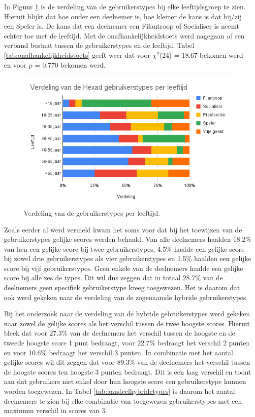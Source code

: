 In Figuur \ref{fig:verdelingleeftijd} is de verdeling van de gebruikerstypes bij elke leeftijdsgroep te zien. Hieruit blijkt dat hoe ouder een deelnemer is, hoe kleiner de kans is dat hij/zij een Speler is. De kans dat een deelnemer een Filantroop of Socialiser is neemt echter toe met de leeftijd. Met de onafhankelijkheidstoets werd nagegaan of een verband bestaat tussen de gebruikerstypes en de leeftijd. Tabel \ref{tab:onafhankelijkheidstoets} geeft weer dat voor $\chi^2$(24) = 18.67 bekomen werd en voor p = 0.770 bekomen werd.

\begin{figure}
    \includegraphics[width=\linewidth]{VerdelingLeeftijd.png}
    \caption{Verdeling van de gebruikerstypes per leeftijd.}
    \label{fig:verdelingleeftijd}
\end{figure}

Zoals eerder al werd vermeld kwam het soms voor dat bij het toewijzen van de gebruikerstypes gelijke scores werden behaald. Van alle deelnemers haalden 18.2\% van hen een gelijke score bij twee gebruikerstypes, 4.5\% haalde een gelijke score bij zowel drie gebruikerstypes als vier gebruikerstypes en 1.5\% haalden een gelijke score bij vijf gebruikerstypes. Geen enkele van de deelnemers haalde een gelijke score bij alle zes de types. Dit wil dus zeggen dat in totaal 28.7\% van de deelnemers geen specifiek gebruikerstype kreeg toegewezen. Het is daarom dat ook werd gekeken naar de verdeling van de zogenaamde hybride gebruikerstypes.

Bij het onderzoek naar de verdeling van de hybride gebruikerstypes werd gekeken naar zowel de gelijke scores als het verschil tussen de twee hoogste scores. Hieruit bleek dat voor 27.3\% van de deelnemers het verschil tussen de hoogste en de tweede hoogste score 1 punt bedraagt, voor 22.7\% bedraagt het verschil 2 punten en voor 10.6\% bedraagt het verschil 3 punten. In combinatie met het aantal gelijke scores wil dit zeggen dat voor 89.3\% van de deelnemers het verschil tussen de hoogste scores ten hoogste 3 punten bedraagt. Dit is een laag verschil en toont aan dat gebruikers niet enkel door hun hoogste score een gebruikerstype kunnen worden toegewezen. In Tabel \ref{tab:aandeelhybridetypes} is daarom het aantal deelnemers te zien bij elke combinatie van toegewezen gebruikerstypes met een maximum verschil in scores van 3.

